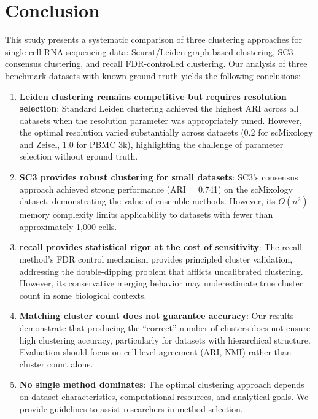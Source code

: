 
\section{Conclusion}
\label{sec:conclusion}

This study presents a systematic comparison of three clustering approaches for single-cell RNA sequencing data: Seurat/Leiden graph-based clustering, SC3 consensus clustering, and recall FDR-controlled clustering. Our analysis of three benchmark datasets with known ground truth yields the following conclusions:

\begin{enumerate}
    \item \textbf{Leiden clustering remains competitive but requires resolution selection}: Standard Leiden clustering achieved the highest ARI across all datasets when the resolution parameter was appropriately tuned. However, the optimal resolution varied substantially across datasets (0.2 for scMixology and Zeisel, 1.0 for PBMC 3k), highlighting the challenge of parameter selection without ground truth.

    \item \textbf{SC3 provides robust clustering for small datasets}: SC3's consensus approach achieved strong performance (ARI = 0.741) on the scMixology dataset, demonstrating the value of ensemble methods. However, its $O(n^2)$ memory complexity limits applicability to datasets with fewer than approximately 1,000 cells.

    \item \textbf{recall provides statistical rigor at the cost of sensitivity}: The recall method's FDR control mechanism provides principled cluster validation, addressing the double-dipping problem that afflicts uncalibrated clustering. However, its conservative merging behavior may underestimate true cluster count in some biological contexts.

    \item \textbf{Matching cluster count does not guarantee accuracy}: Our results demonstrate that producing the ``correct'' number of clusters does not ensure high clustering accuracy, particularly for datasets with hierarchical structure. Evaluation should focus on cell-level agreement (ARI, NMI) rather than cluster count alone.

    \item \textbf{No single method dominates}: The optimal clustering approach depends on dataset characteristics, computational resources, and analytical goals. We provide guidelines to assist researchers in method selection.
\end{enumerate}

